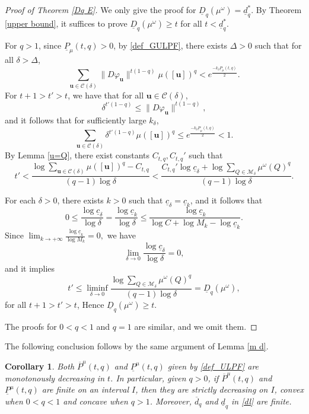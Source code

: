 \documentclass[12pt]{amsart}
\theoremstyle{plain}
\newtheorem{cor}[thm]{Corollary}
\theoremstyle{definition}
\theoremstyle{remark}
\newcommand{\bu}{\mathbf{u}}
\begin{document}
\begin{proof}[Proof of Theorem \ref{Dq E}]
We only give the proof for $\underline{D}_q(\mu^\omega)=\underline{d}_q^*$. By Theorem \ref{upper bound}, it suffices to prove $\underline{D}_q(\mu^\omega)\ge t$ for all $t<\underline{d}_q^*$.


For $q>1$, since $\underline P_\mu(t, q)>0$, by \eqref{def_GULPF}, there exists $\Delta>0$ such that
for all $\delta>\Delta$, 
$$
\sum_{\mathbf{u}\in\mathcal{C}(\delta)}\|D\varphi_\mathbf{u}\|^{t(1-q)}\mu([\bu])^q<e^\frac{-k_{\delta}  \underline P_\mu(t, q)}{2}.
$$
For $t+1>t'>t$,  we have that for all $\bu\in\mathcal{C}(\delta)$, 
$$
\delta^{t'(1-q)}\le\|D\varphi_\bu\|^{t(1-q)},
$$
and it follows that for sufficiently large $k_\delta$, 
$$
\sum_{\mathbf{u}\in\mathcal{C}(\delta)}\delta^{t'(1-q)}\mu([\bu])^q\le e^\frac{-k_{\delta}  \underline P_\mu(t, q)}{2}<1.
$$
By Lemma \ref{u=Q},     there exist constants $C_{t,q}, C_{t,q}'$ such that
$$
t'<\frac{\log\sum_{\mathbf{u}\in\mathcal{C}(\delta)}\mu([\bu])^q- C_{t,q}}{(q-1)\log \delta}<\frac{ C_{t,q}'\log \underline c_\delta+\log\sum_{Q\in{\mathcal{M}_\delta}}\mu^\omega(Q)^q}{(q-1)\log \delta}.
$$

For each $\delta>0$, there exists  $k>0$ such that $\underline c_\delta=\underline c_k$, and it follows that 
$$
0\le\frac{\log\underline c_\delta}{\log \delta}=\frac{\log\underline c_k}{\log \delta}\le      \frac{\log\underline c_k}{\log C+\log M_k-\log \underline c_k}. 
$$
Since $\lim_{k\to +\infty} \frac{\log\underline c_k}{\log M_k}=0,$ we have
$$
\lim_{\delta\to 0} \frac{\log \underline c_\delta}{\log \delta}=0,
$$
and it implies 
$$
t'\le\liminf_{\delta\to 0}\frac{\log \sum_{Q\in{\mathcal{M}_\delta}}\mu^\omega(Q)^q}{(q-1)\log \delta}=\underline{D}_q(\mu^\omega), 
$$
for  all $t+1>t'>t$,
Hence  $\underline{D}_q(\mu^\omega)\ge t$.


The proofs for $0<q<1$ and $q=1$ are similar, and  we omit them.
\end{proof}



The following conclusion follows by the same argument of Lemma \ref{m d}. 
\begin{cor}\label{m d1}
Both  $\overline P^\mu(t, q)$ and  $\underline P^\mu(t, q)$ given by \eqref{def_ULPF} are  monotonously decreasing  in $t$. In particular, given $q>0$,   if $\overline P^\mu(t, q)$ and  $\underline P^\mu(t, q)$ are finite on an  interval $I$, then they are strictly decreasing on $I$,  convex  when $0<q<1$ and  concave   when $q>1$. Moreover, $\overline{d}_q$ and $\underline{d}_q$ in \eqref{dl} are finite.  
\end{cor}
\end{document}
